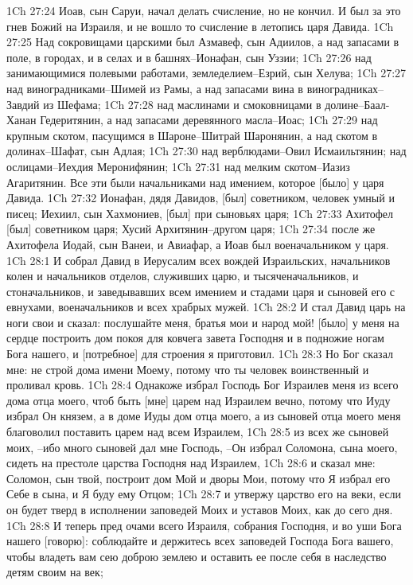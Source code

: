 1Ch 27:24  Иоав, сын Саруи, начал делать счисление, но не кончил. И был за это гнев Божий на Израиля, и не вошло то счисление в летопись царя Давида.
1Ch 27:25  Над сокровищами царскими был Азмавеф, сын Адиилов, а над запасами в поле, в городах, и в селах и в башнях--Ионафан, сын Уззии;
1Ch 27:26  над занимающимися полевыми работами, земледелием--Езрий, сын Хелува;
1Ch 27:27  над виноградниками--Шимей из Рамы, а над запасами вина в виноградниках--Завдий из Шефама;
1Ch 27:28  над маслинами и смоковницами в долине--Баал-Ханан Гедеритянин, а над запасами деревянного масла--Иоас;
1Ch 27:29  над крупным скотом, пасущимся в Шароне--Шитрай Шаронянин, а над скотом в долинах--Шафат, сын Адлая;
1Ch 27:30  над верблюдами--Овил Исмаильтянин; над ослицами--Иехдия Меронифянин;
1Ch 27:31  над мелким скотом--Иазиз Агаритянин. Все эти были начальниками над имением, которое [было] у царя Давида.
1Ch 27:32  Ионафан, дядя Давидов, [был] советником, человек умный и писец; Иехиил, сын Хахмониев, [был] при сыновьях царя;
1Ch 27:33  Ахитофел [был] советником царя; Хусий Архитянин--другом царя;
1Ch 27:34  после же Ахитофела Иодай, сын Ванеи, и Авиафар, а Иоав был военачальником у царя.
1Ch 28:1  И собрал Давид в Иерусалим всех вождей Израильских, начальников колен и начальников отделов, служивших царю, и тысяченачальников, и стоначальников, и заведывавших всем имением и стадами царя и сыновей его с евнухами, военачальников и всех храбрых мужей.
1Ch 28:2  И стал Давид царь на ноги свои и сказал: послушайте меня, братья мои и народ мой! [было] у меня на сердце построить дом покоя для ковчега завета Господня и в подножие ногам Бога нашего, и [потребное] для строения я приготовил.
1Ch 28:3  Но Бог сказал мне: не строй дома имени Моему, потому что ты человек воинственный и проливал кровь.
1Ch 28:4  Однакоже избрал Господь Бог Израилев меня из всего дома отца моего, чтоб быть [мне] царем над Израилем вечно, потому что Иуду избрал Он князем, а в доме Иуды дом отца моего, а из сыновей отца моего меня благоволил поставить царем над всем Израилем,
1Ch 28:5  из всех же сыновей моих, --ибо много сыновей дал мне Господь, --Он избрал Соломона, сына моего, сидеть на престоле царства Господня над Израилем,
1Ch 28:6  и сказал мне: Соломон, сын твой, построит дом Мой и дворы Мои, потому что Я избрал его Себе в сына, и Я буду ему Отцом;
1Ch 28:7  и утвержу царство его на веки, если он будет тверд в исполнении заповедей Моих и уставов Моих, как до сего дня.
1Ch 28:8  И теперь пред очами всего Израиля, собрания Господня, и во уши Бога нашего [говорю]: соблюдайте и держитесь всех заповедей Господа Бога вашего, чтобы владеть вам сею доброю землею и оставить ее после себя в наследство детям своим на век;
